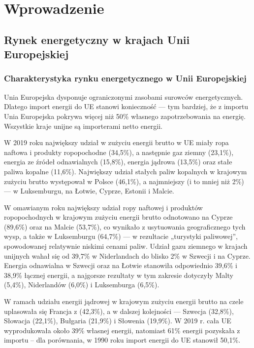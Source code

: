 \documentclass[polish, twoside, 12pt, a4paper]{article}
\theoremstyle{definition}
\theoremstyle{plain}
\theoremstyle{remark}
\begin{document}
\clearpage

\section{Wprowadzenie}

\subsection{Rynek energetyczny w krajach Unii Europejskiej}
\subsubsection{Charakterystyka rynku energetycznego w Unii Europejskiej}

Unia Europejska dysponuje ograniczonymi zasobami surowców energetycznych. Dlatego import energii do UE stanowi konieczność --- tym bardziej, że z importu Unia Europejska pokrywa więcej niż 50\% własnego zapotrzebowania na energię. Wszystkie kraje unijne są importerami netto energii. 

W 2019 roku największy udział w zużyciu energii brutto w UE miały ropa naftowa i produkty ropopochodne (34,5\%), a następnie gaz ziemny (23,1\%), energia ze źródeł odnawialnych (15,8\%), energia jądrowa (13,5\%) oraz stałe paliwa kopalne (11,6\%). Największy udział stałych paliw kopalnych w krajowym zużyciu brutto występował w Polsce (46,1\%), a najmniejszy (i to mniej niż 2\%) --- w Luksemburgu, na Łotwie, Cyprze, Estonii i Malcie.

W omawianym roku największy udział ropy naftowej i produktów ropopochodnych w krajowym zużyciu energii brutto odnotowano na Cyprze (89,6\%) oraz na Malcie (53,7\%), co wynikało z usytuowania geograficznego tych wysp, a także w Luksemburgu (64,7\%) --- w rezultacie „turystyki paliwowej”, spowodowanej relatywnie niskimi cenami paliw. Udział gazu ziemnego w krajach unijnych wahał się od 39,7\% w Niderlandach do blisko 2\% w Szwecji i na Cyprze. Energia odnawialna w Szwecji oraz na Łotwie stanowiła odpowiednio 39,6\% i 38,9\% łącznej energii, a najgorsze rezultaty w tym zakresie dotyczyły Malty (5,4\%), Niderlandów (6,0\%) i Luksemburga (6,5\%). 

W ramach udziału energii jądrowej w krajowym zużyciu energii brutto na czele uplasowała się Francja z (42,3\%), a w dalszej kolejności --- Szwecja (32,8\%), Słowacja (22,1\%), Bułgaria (21,9\%) i Słowenia (19,9\%). W 2019 r. cała UE wyprodukowała około 39\% własnej energii, natomiast 61\% energii pozyskała z importu – dla porównania, w 1990 roku import energii do UE stanowił 50,1\%.
\end{document}
